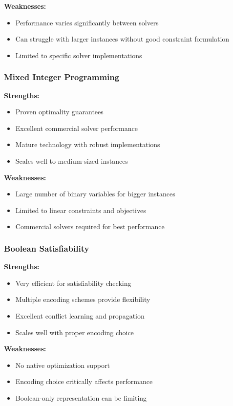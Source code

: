 \documentclass[11pt]{article}
\begin{document}
\textbf{Weaknesses:}
\begin{itemize}
    \item Performance varies significantly between solvers
    \item Can struggle with larger instances without good constraint formulation
    \item Limited to specific solver implementations
\end{itemize}

\subsubsection{Mixed Integer Programming}
\textbf{Strengths:}
\begin{itemize}
    \item Proven optimality guarantees
    \item Excellent commercial solver performance
    \item Mature technology with robust implementations
    \item Scales well to medium-sized instances
\end{itemize}

\textbf{Weaknesses:}
\begin{itemize}
    \item Large number of binary variables for bigger instances
    \item Limited to linear constraints and objectives
    \item Commercial solvers required for best performance
\end{itemize}

\subsubsection{Boolean Satisfiability}
\textbf{Strengths:}
\begin{itemize}
    \item Very efficient for satisfiability checking
    \item Multiple encoding schemes provide flexibility
    \item Excellent conflict learning and propagation
    \item Scales well with proper encoding choice
\end{itemize}

\textbf{Weaknesses:}
\begin{itemize}
    \item No native optimization support
    \item Encoding choice critically affects performance
    \item Boolean-only representation can be limiting
\end{itemize}
\end{document}
